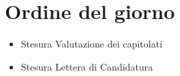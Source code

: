 \section{Ordine del giorno}

\begin{itemize}
	\item Stesura Valutazione dei capitolati
    \item Stesura Lettera di Candidatura

\end{itemize}